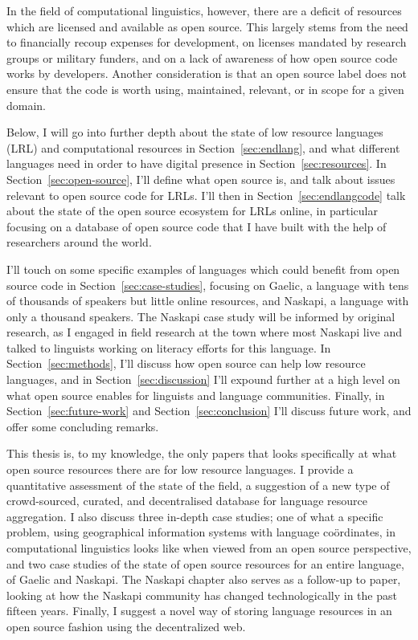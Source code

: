 In the field of computational linguistics, however, there are a deficit of resources which are licensed and available as open source. This largely stems from the need to financially recoup expenses for development, on licenses mandated by research groups or military funders, and on a lack of awareness of how open source code works by developers. Another consideration is that an open source label does not ensure that the code is worth using, maintained, relevant, or in scope for a given domain.

Below, I will go into further depth about the state of low resource languages (LRL) and computational resources in Section~\ref{sec:endlang}, and what different languages need in order to have digital presence in Section~\ref{sec:resources}. In Section~\ref{sec:open-source}, I'll define what open source is, and talk about issues relevant to open source code for LRLs. I'll then in Section~\ref{sec:endlangcode} talk about the state of the open source ecosystem for LRLs online, in particular focusing on a database of open source code that I have built with the help of researchers around the world.

I'll touch on some specific examples of languages which could benefit from open source code in Section~\ref{sec:case-studies}, focusing on Gaelic, a language with tens of thousands of speakers but little online resources, and Naskapi, a language with only a thousand speakers. The Naskapi case study will be informed by original research, as I engaged in field research at the town where most Naskapi live and talked to linguists working on literacy efforts for this language. In Section~\ref{sec:methods}, I'll discuss how open source can help low resource languages, and in Section~\ref{sec:discussion} I'll expound further at a high level on what open source enables for linguists and language communities. Finally, in Section~\ref{sec:future-work} and Section~\ref{sec:conclusion} I'll discuss future work, and offer some concluding remarks.

This thesis is, to my knowledge, the only papers that looks specifically at what open source resources there are for low resource languages. I provide a quantitative assessment of the state of the field, a suggestion of a new type of crowd-sourced, curated, and decentralised database for language resource aggregation. I also discuss three in-depth case studies; one of what a specific problem, using geographical information systems with language co\"{o}rdinates, in computational linguistics looks like when viewed from an open source perspective, and two case studies of the state of open source resources for an entire language, of Gaelic and Naskapi. The Naskapi chapter also serves as a follow-up to  paper, looking at how the Naskapi community has changed technologically in the past fifteen years. Finally, I suggest a novel way of storing language resources in an open source fashion using the decentralized web.
